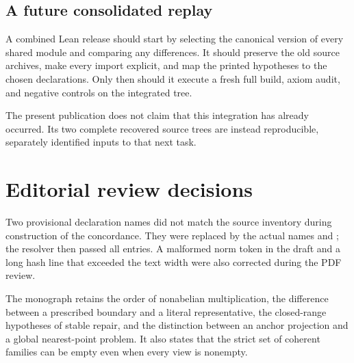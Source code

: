 \documentclass[11pt]{article}
\begin{document}
\subsection{A future consolidated replay}
A combined Lean release should start by selecting the canonical version of every shared module and comparing any differences. It should preserve the old source archives, make every import explicit, and map the printed hypotheses to the chosen declarations. Only then should it execute a fresh full build, axiom audit, and negative controls on the integrated tree.

The present publication does not claim that this integration has already occurred. Its two complete recovered source trees are instead reproducible, separately identified inputs to that next task.

\section{Editorial review decisions}
Two provisional declaration names did not match the source inventory during construction of the concordance. They were replaced by the actual names  and ; the resolver then passed all entries. A malformed norm token in the draft and a long hash line that exceeded the text width were also corrected during the PDF review.

The monograph retains the order of nonabelian multiplication, the difference between a prescribed boundary and a literal representative, the closed-range hypotheses of stable repair, and the distinction between an anchor projection and a global nearest-point problem. It also states that the strict set of coherent families can be empty even when every view is nonempty.
\end{document}
